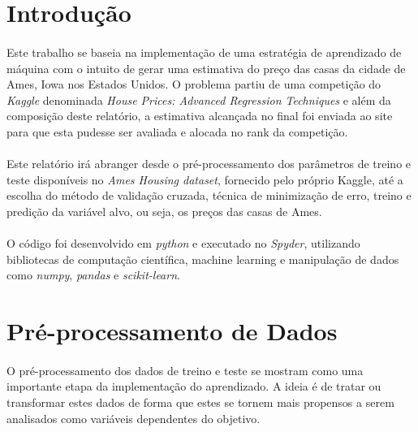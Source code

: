 \documentclass{article}
\begin{document}
\large


\section{Introdução}
	\paragraph{}Este trabalho se baseia na implementação de uma estratégia de aprendizado de máquina com o intuito de gerar uma estimativa do preço das casas da cidade de Ames, Iowa nos Estados Unidos. O problema partiu de uma competição do \textit{Kaggle} denominada \textit{House Prices: Advanced Regression Techniques} e além da composição deste relatório, a estimativa alcançada no final foi enviada ao site para que esta pudesse ser avaliada e alocada no rank da competição.
	
	\paragraph{}Este relatório irá abranger desde o pré-processamento dos parâmetros de treino e teste disponíveis no \textit{Ames Housing dataset}, fornecido pelo próprio Kaggle, até a escolha do método de validação cruzada, técnica de minimização de erro, treino e predição da variável alvo, ou seja, os preços das casas de Ames.
	
	\paragraph{}O código foi desenvolvido em \textit{python} e executado no \textit{Spyder}, utilizando bibliotecas de computação científica, machine learning e manipulação de dados como \textit{numpy}, \textit{pandas} e \textit{scikit-learn}.

\section{Pré-processamento de Dados}
	\paragraph{}O pré-processamento dos dados de treino e teste se mostram como uma importante etapa da implementação do aprendizado. A ideia é de tratar ou transformar estes dados de forma que estes se tornem mais propensos a serem analisados como variáveis dependentes do objetivo.
	
\end{document}
